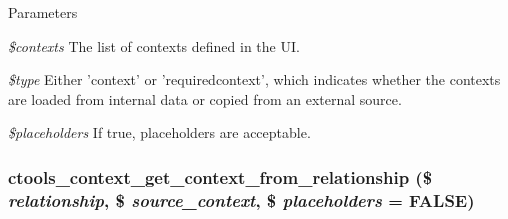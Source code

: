 \begin{DoxyParams}{Parameters}
\item[{\em \$contexts}]The list of contexts defined in the UI. \item[{\em \$type}]Either 'context' or 'requiredcontext', which indicates whether the contexts are loaded from internal data or copied from an external source. \item[{\em \$placeholders}]If true, placeholders are acceptable. \end{DoxyParams}
\hypertarget{context_8inc_a94c40749ef39bfbb942cbca3e6c73f55}{
\subsubsection[{ctools\_\-context\_\-get\_\-context\_\-from\_\-relationship}]{\setlength{\rightskip}{0pt plus 5cm}ctools\_\-context\_\-get\_\-context\_\-from\_\-relationship (\$ {\em relationship}, \/  \$ {\em source\_\-context}, \/  \$ {\em placeholders} = {\ttfamily FALSE})}}
\label{context_8inc_a94c40749ef39bfbb942cbca3e6c73f55}

